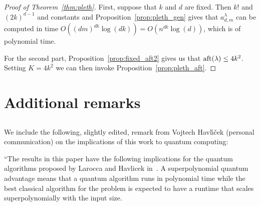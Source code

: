 \documentclass[11pt]{amsart}
\theoremstyle{plain}
\theoremstyle{definition}
\numberwithin{equation}{section}
\newcommand{\la}{\lambda}
\def\la{\lambda}
\begin{document}
\begin{proof}[Proof of Theorem~\ref{thm:pleth}]
First, suppose that $k$ and $d$ are fixed. Then $k!$ and $(2k)^{d-1}$ and constants and  Proposition~\ref{prop:pleth_gen} gives that $a^\la_{d,m}$ can be computed in time $O((dm)^{dk}\log(dk)) = O(n^{dk}\log(d))$, which is of polynomial time. 

For the second part, Proposition~\ref{prop:fixed_aft2} gives us that ${\rm aft}(\la) \leq 4k^2$. Setting $K=4k^2$ we can then invoke Proposition~\ref{prop:pleth_aft}. 
\end{proof}

\section{Additional remarks}

\subsection{} We include the following, slightly edited, remark from Vojtech  Havl{\'\i}{\v{c}}ek (personal communication) on the implications of this work to quantum computing:

``The results in this paper have the following implications for the quantum algorithms proposed by Larocca and Havlicek in~\cite{LH24}. A superpolynomial quantum advantage means that a quantum algorithm runs in polynomial time while the best classical algorithm for the problem is expected to have a runtime that scales superpolynomially with the input size.
\end{document}
